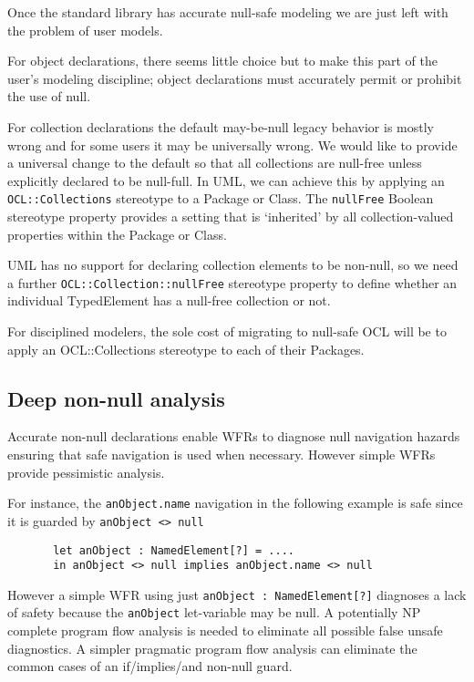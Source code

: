 \documentclass{llncs}
\begin{document}
Once the standard library has accurate null-safe modeling we are just left with the problem of user models.

For object declarations, there seems little choice but to make this part of the user's modeling discipline; object declarations must accurately permit or prohibit the use of null.

For collection declarations the default may-be-null legacy behavior is mostly wrong and for some users it may be universally wrong. We would like to provide a universal change to the default so that all collections are null-free unless explicitly declared to be null-full. In UML, we can achieve this by applying an \verb$OCL::Collections$ stereotype to a Package or Class. The \verb$nullFree$ Boolean stereotype property provides a setting that is `inherited' by all collection-valued properties within the Package or Class.

UML has no support for declaring collection elements to be non-null, so we need a further \verb$OCL::Collection::nullFree$ stereotype property to define whether an individual TypedElement has a null-free collection or not.

For disciplined modelers, the sole cost of migrating to null-safe OCL will be to apply an OCL::Collections stereotype to each of their Packages.

\subsection{Deep non-null analysis}

Accurate non-null declarations enable WFRs to diagnose null navigation hazards ensuring that safe navigation is used when necessary. However simple WFRs provide pessimistic analysis.

For instance, the \verb$anObject.name$ navigation in the following example is safe since it is guarded by \verb$anObject <> null$

\begin{verbatim}
       let anObject : NamedElement[?] = .... 
       in anObject <> null implies anObject.name <> null
\end{verbatim}

However a simple WFR using just \verb$anObject : NamedElement[?]$ diagnoses a lack of safety because the \verb$anObject$ let-variable may be null. A potentially NP complete program flow analysis is needed to eliminate all possible false unsafe diagnostics. A simpler pragmatic program flow analysis can eliminate the common cases of an if/implies/and non-null guard.
\end{document}
